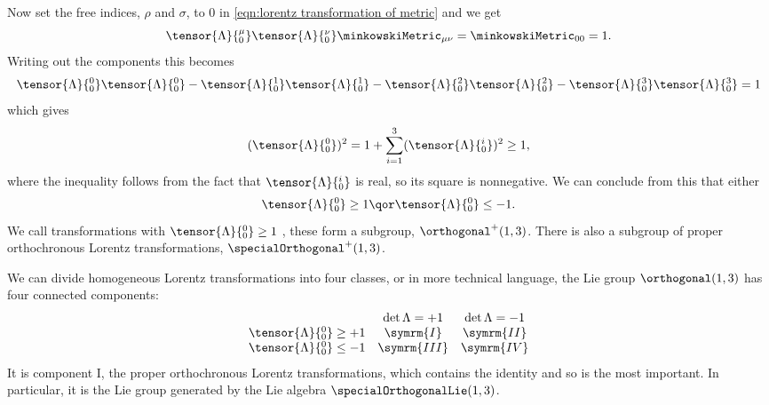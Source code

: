 Now set the free indices, \(\rho\) and \(\sigma\), to 0 in \cref{eqn:lorentz transformation of metric} and we get
\begin{equation}
    \tensor{\Lambda}{^\mu_0} \tensor{\Lambda}{^\nu_0} \minkowskiMetric_{\mu\nu} = \minkowskiMetric_{00} = 1.
\end{equation}
Writing out the components this becomes
\begin{equation}
    \tensor{\Lambda}{^0_0} \tensor{\Lambda}{^0_0} - \tensor{\Lambda}{^1_0}\tensor{\Lambda}{^1_0} - \tensor{\Lambda}{^2_0}\tensor{\Lambda}{^2_0} - \tensor{\Lambda}{^3_0}\tensor{\Lambda}{^3_0} = 1
\end{equation}
which gives
\begin{equation}
    (\tensor{\Lambda}{^0_0})^2 = 1 + \sum_{i = 1}^{3} (\tensor{\Lambda}{^i_0})^2 \ge 1,
\end{equation}
where the inequality follows from the fact that \(\tensor{\Lambda}{^i_0}\) is real, so its square is nonnegative.
We can conclude from this that either
\begin{equation}
    \tensor{\Lambda}{^0_0} \ge 1 \qor \tensor{\Lambda}{^0_0} \le -1.
\end{equation}
We call transformations with \(\tensor{\Lambda}{^0_0} \ge 1\) , these form a subgroup, \(\orthogonal^+(1, 3)\).
There is also a subgroup of proper orthochronous Lorentz transformations, \(\specialOrthogonal^+(1, 3)\).

We can divide homogeneous Lorentz transformations into four classes, or in more technical language, the Lie group \(\orthogonal(1, 3)\) has four connected components:
\begin{equation}
    \begin{array}{ccc}
        & \det \Lambda = + 1 & \det \Lambda = -1\\
        \tensor{\Lambda}{^0_0} \ge +1 & \symrm{I} & \symrm{II}\\
        \tensor{\Lambda}{^0_0} \le -1 & \symrm{III} & \symrm{IV}
    \end{array}
\end{equation}
It is component I, the proper orthochronous Lorentz transformations, which contains the identity and so is the most important.
In particular, it is the Lie group generated by the Lie algebra \(\specialOrthogonalLie(1, 3)\).

